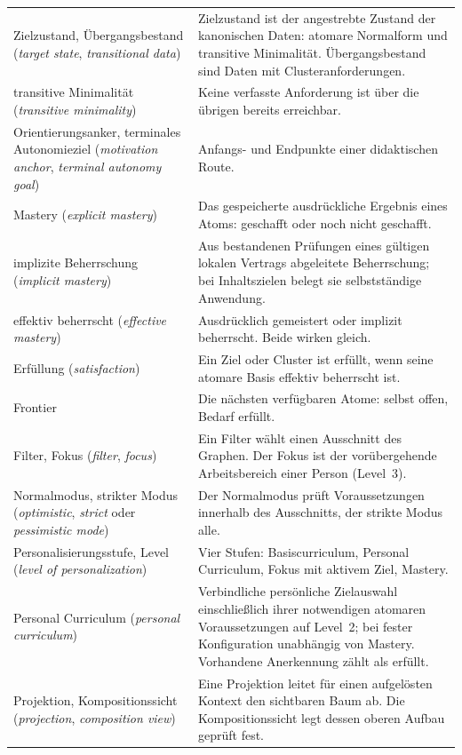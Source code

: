 \begin{longtable}{@{}P{42mm}P{106mm}@{}}
Zielzustand, Übergangsbestand (\emph{target state}, \emph{transitional
data}) & Zielzustand ist der angestrebte Zustand der kanonischen Daten:
atomare Normalform und transitive Minimalität. Übergangsbestand sind Daten
mit Clusteranforderungen.\\
transitive Minimalität (\emph{transitive minimality}) & Keine verfasste
Anforderung ist über die übrigen bereits erreichbar.\\
Orientierungsanker, terminales Autonomieziel (\emph{motivation anchor},
\emph{terminal autonomy goal}) & Anfangs- und Endpunkte einer didaktischen
Route.\\
Mastery (\emph{explicit mastery}) & Das gespeicherte ausdrückliche Ergebnis
eines Atoms: geschafft oder noch nicht geschafft.\\
implizite Beherrschung (\emph{implicit mastery}) & Aus bestandenen
Prüfungen eines gültigen lokalen Vertrags abgeleitete Beherrschung; bei
Inhaltszielen belegt sie selbstständige Anwendung.\\
effektiv beherrscht (\emph{effective mastery}) & Ausdrücklich gemeistert
oder implizit beherrscht. Beide wirken gleich.\\
Erfüllung (\emph{satisfaction}) & Ein Ziel oder Cluster ist erfüllt, wenn
seine atomare Basis effektiv beherrscht ist.\\
Frontier & Die nächsten verfügbaren Atome: selbst offen, Bedarf erfüllt.\\
Filter, Fokus (\emph{filter}, \emph{focus}) & Ein Filter wählt einen
Ausschnitt des Graphen. Der Fokus ist der vorübergehende Arbeitsbereich
einer Person (Level~3).\\
Normalmodus, strikter Modus (\emph{optimistic}, \emph{strict} oder
\emph{pessimistic mode}) & Der Normalmodus prüft Voraussetzungen innerhalb
des Ausschnitts, der strikte Modus alle.\\
Personalisierungsstufe, Level (\emph{level of personalization}) & Vier
Stufen: Basiscurriculum, Personal Curriculum, Fokus mit aktivem Ziel,
Mastery.\\
Personal Curriculum (\emph{personal curriculum}) & Verbindliche persönliche
Zielauswahl einschließlich ihrer notwendigen atomaren Voraussetzungen auf
Level~2; bei fester Konfiguration unabhängig von Mastery. Vorhandene
Anerkennung zählt als erfüllt.\\
Projektion, Kompositionssicht (\emph{projection}, \emph{composition view}) &
Eine Projektion leitet für einen aufgelösten Kontext den sichtbaren Baum
ab. Die Kompositionssicht legt dessen oberen Aufbau geprüft fest.\\

\end{longtable}
